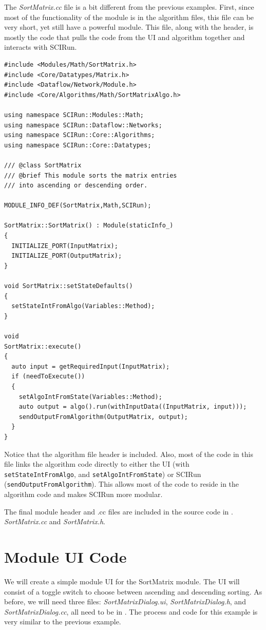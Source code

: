 \documentclass[fleqn,11pt,openany]{book}
\begin{document}
The \emph{SortMatrix.cc} file is a bit different from the previous examples.  
First, since most of the functionality of the module is in the algorithm files, this file can be very short, yet still have a powerful module.
This file, along with the header, is mostly the code that pulls the code from the UI and algorithm together and interacts with SCIRun.  
\begin{verbatim}
#include <Modules/Math/SortMatrix.h>
#include <Core/Datatypes/Matrix.h>
#include <Dataflow/Network/Module.h>
#include <Core/Algorithms/Math/SortMatrixAlgo.h>

using namespace SCIRun::Modules::Math;
using namespace SCIRun::Dataflow::Networks;
using namespace SCIRun::Core::Algorithms;
using namespace SCIRun::Core::Datatypes;

/// @class SortMatrix
/// @brief This module sorts the matrix entries 
/// into ascending or descending order.

MODULE_INFO_DEF(SortMatrix,Math,SCIRun);

SortMatrix::SortMatrix() : Module(staticInfo_)
{
  INITIALIZE_PORT(InputMatrix);
  INITIALIZE_PORT(OutputMatrix);
}

void SortMatrix::setStateDefaults()
{
  setStateIntFromAlgo(Variables::Method);
}

void
SortMatrix::execute()
{
  auto input = getRequiredInput(InputMatrix);
  if (needToExecute())
  {
    setAlgoIntFromState(Variables::Method);
    auto output = algo().run(withInputData((InputMatrix, input)));   
    sendOutputFromAlgorithm(OutputMatrix, output);
  }
}
\end{verbatim}
Notice that the algorithm file header is included. 
Also, most of the code in this file links the algorithm code directly to either the UI (with \verb|setStateIntFromAlgo|, and \verb|setAlgoIntFromState|) or SCIRun (\verb|sendOutputFromAlgorithm|). 
This allows most of the code to reside in the algorithm code and makes SCIRun more modular.

The final module header and .cc files are included in the source code in \emph{}.  \emph{SortMatrix.cc} and \emph{SortMatrix.h}.

\section{Module UI Code}
\label{sec:algo_ui}

We will create a simple module UI for the SortMatrix module.  
The UI will consist of a toggle switch to choose between ascending and descending sorting.  
As before, we will need three files: \emph{SortMatrixDialog.ui}, \emph{SortMatrixDialog.h}, and \emph{SortMatrixDialog.cc}, all need to be in \emph{}.
The process and code for this example is very similar to the previous example.
\end{document}
